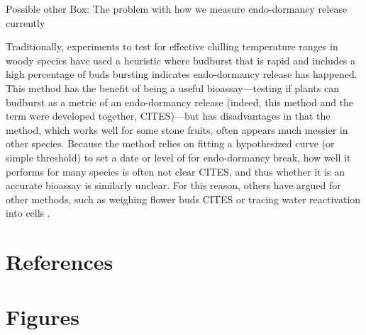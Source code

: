 \documentclass[11pt]{article}
\begin{document}
\vspace{5ex}
{\sc Possible other Box: The problem with how we measure endo-dormancy release currently} %

 Traditionally, experiments to test for effective chilling temperature ranges in woody species have used a heuristic where budburst that is rapid and includes a high percentage of buds bursting indicates endo-dormancy release has happened. This method has the benefit of being a useful bioassay---testing if plants can budburst as a metric of an endo-dormancy release (indeed, this method and the term were developed together, CITES)---but has disadvantages in that the method, which works well for some stone fruits, often appears much messier in other species. Because the method relies on fitting a hypothesized curve (or simple threshold) to set a date or level of for endo-dormancy break, how well it performs for many species is often not clear CITES, and thus whether it is an accurate bioassay is similarly unclear. For this reason, others have argued for other methods, such as weighing flower buds \citep{chuine2016}CITES or tracing water reactivation into cells \citep{faust1991bound,Kalcsits2009}. 


\clearpage

\section{References}



\clearpage
\section{Figures}
\end{document}
